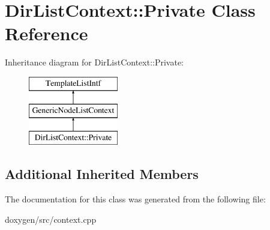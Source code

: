 \hypertarget{class_dir_list_context_1_1_private}{}\section{Dir\+List\+Context\+::Private Class Reference}
\label{class_dir_list_context_1_1_private}
Inheritance diagram for Dir\+List\+Context\+::Private\+:\begin{figure}[H]
\begin{center}
\leavevmode
\includegraphics[height=3.000000cm]{class_dir_list_context_1_1_private}
\end{center}
\end{figure}
\subsection*{Additional Inherited Members}


The documentation for this class was generated from the following file\+:\begin{DoxyCompactItemize}
\item 
doxygen/src/context.\+cpp\end{DoxyCompactItemize}
